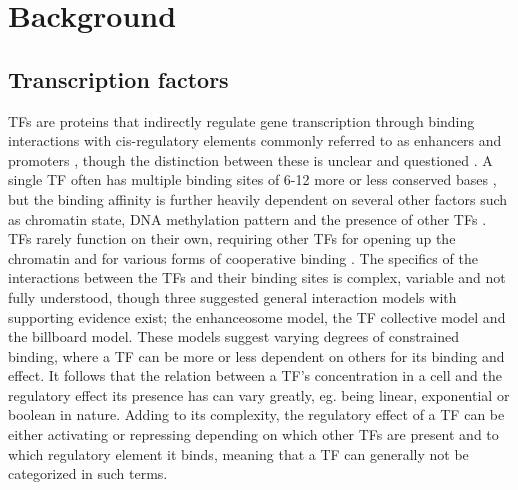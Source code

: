 \chapter{Background}
\label{sec:background}
\vspace{-0.75cm}
\section{Transcription factors}
\acp{TF} are proteins that indirectly regulate gene transcription through binding interactions with cis-regulatory elements commonly referred to as enhancers and promoters \cite{Spitz2012}, though the distinction between these is unclear and questioned \cite{Andersson2020}. A single \ac{TF} often has multiple binding sites of 6-12 more or less conserved bases \cite{lambert2018}, but the binding affinity is further heavily dependent on several other factors such as chromatin state, DNA methylation pattern \cite{Yineaaj2239} and the presence of other \acp{TF} \cite{jolma2015}. \acp{TF} rarely function on their own, requiring other \acp{TF} for opening up the chromatin and for various forms of cooperative binding \cite{lambert2018,Spitz2012}. The specifics of the interactions between the \acp{TF} and their binding sites is complex, variable and not fully understood, though three suggested general interaction models with supporting evidence exist; the enhanceosome model, the \ac{TF} collective model and the billboard model. These models suggest varying degrees of constrained binding, where a \ac{TF} can be more or less dependent on others for its binding and effect. It follows that the relation between a \ac{TF}'s concentration in a cell and the regulatory effect its presence has can vary greatly, eg. being linear, exponential or boolean in nature. Adding  to its complexity, the regulatory effect of a \ac{TF} can be either activating or repressing depending on which other \acp{TF} are present and to which regulatory element it binds, meaning that a \ac{TF} can generally not be categorized in such terms.

